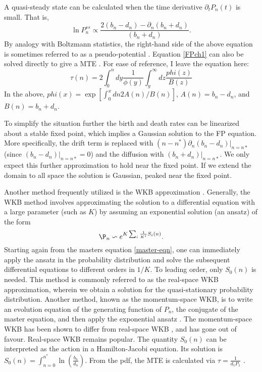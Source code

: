 A quasi-steady state can be calculated when the time derivative $\partial_t P_n(t)$ is small. 
That is,
\begin{equation}
\ln P_n^{ss} \propto \frac{2(b_n - d_n) - \partial_n(b_n + d_n)}{(b_n + d_n)}. 
\end{equation}
By analogy with Boltzmann statistics, the right-hand side of the above equation is sometimes referred to as a pseudo-potential \cite{Zhou-ish}. 
Equation \ref{FPch1} can also be solved directly to give a MTE \cite{Gardiner2004}. 
For ease of reference, I leave the equation here:
\begin{equation}
\tau(n) = 2\int_0^n dy \frac{1}{\phi(y)} \int_y^\infty dz \frac{phi(z)}{B(z)}
\end{equation}
In the above, $phi(x) = \exp\left[\int_0^x dn 2 A(n)/B(n)\right]$, $A(n) = b_n - d_n$, and $B(n) = b_n + d_n$. 

To simplify the situation further the birth and death rates can be linearized about a stable fixed point, which implies a Gaussian solution to the FP equation. 
More specifically, the drift term is replaced with $(n-n^*)\partial_n(b_n - d_n)|_{n=n*}$ (since $(b_n - d_n)|_{n=n*}=0$) and the diffusion with $(b_n + d_n)|_{n=n*}$. 
We only expect this further approximation to hold near the fixed point. 
If we extend the domain to all space the solution is Gaussian, peaked near the fixed point. 

Another method frequently utilized is the WKB approximation \cite{}.
Generally, the WKB method involves approximating the solution to a differential equation with a large parameter (such as $K$) by assuming an exponential solution (an ansatz) of the form
\begin{equation}
\P_n \backsim e^{K\sum_i \frac{1}{K^i}S_i(n)}.
\label{WKBansatz}
\end{equation}
Starting again from the masters equation \ref{master-eqn}, one can immediately apply the ansatz in the probability distribution and solve the subsequent differential equations to different orders in $1/K$\cite{Assaf2016,etc}.%
To leading order, only $S_0(n)$ is needed. 
This method is commonly referred to as the real-space WKB approximation, wherein we obtain a solution for the quasi-stationary probability distribution.
Another method, known as the momentum-space WKB, is to write an evolution equation of the generating function of $P_n$, the conjugate of the master equation, and then apply the exponential ansatz \cite{Generating function stuff}.
The momentum-space WKB has been shown to differ from real-space WKB \cite{Ovaskainen?}, and has gone out of favour. 
Real-space WKB remains popular. 
The quantity $S_0(n)$ can be interpreted as the action in a Hamilton-Jacobi equation. 
Its solution is $S_0(n) = \int_{n=0}^{n^*} \ln\left(\frac{b_n}{d_n}\right)$. %
From the pdf, the MTE is calculated via $\tau = \frac{1}{d_1 P_1}$ \cite{Assaf?}. 


